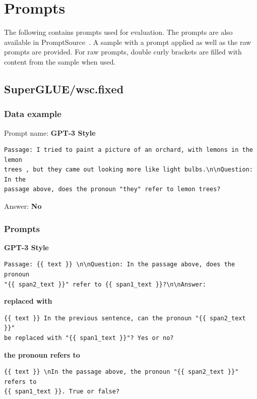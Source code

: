 \documentclass[twoside,11pt]{article}
\begin{document}
\vskip 0.2in


\appendix


\section{Prompts}\label{app:mt-app}

The following contains prompts used for evaluation. The prompts are also available in PromptSource~\citep{bach2022promptsource}. A sample with a prompt applied as well as the raw prompts are provided. For raw prompts, double curly brackets are filled with content from the sample when used.

\localtableofcontents

\subsection{SuperGLUE/wsc.fixed}

\subsubsection{Data example}

Prompt name: \textbf{GPT-3 Style}
\begin{verbatim}
Passage: I tried to paint a picture of an orchard, with lemons in the lemon 
trees , but they came out looking more like light bulbs.\n\nQuestion: In the 
passage above, does the pronoun "they" refer to lemon trees?
\end{verbatim}
Answer: \textbf{No}

\subsubsection{Prompts}

\textbf{GPT-3 Style}
\begin{verbatim}
Passage: {{ text }} \n\nQuestion: In the passage above, does the pronoun 
"{{ span2_text }}" refer to {{ span1_text }}?\n\nAnswer:
\end{verbatim}

\noindent\textbf{replaced with}
\begin{verbatim}
{{ text }} In the previous sentence, can the pronoun "{{ span2_text }}" 
be replaced with "{{ span1_text }}"? Yes or no?
\end{verbatim}

\noindent\textbf{the pronoun refers to}
\begin{verbatim}
{{ text }} \nIn the passage above, the pronoun "{{ span2_text }}" refers to 
{{ span1_text }}. True or false?
\end{verbatim}
\end{document}
